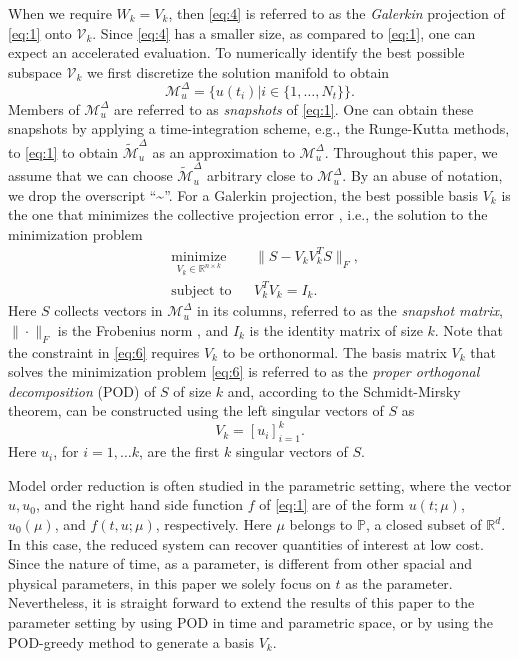 When we require $W_k=V_k$, then \eqref{eq:4} is referred to as the \emph{Galerkin} projection of \eqref{eq:1} onto $\mathcal V_k$. Since \eqref{eq:4} has a smaller size, as compared to \eqref{eq:1}, one can expect an accelerated evaluation. To numerically identify the best possible subspace $\mathcal V_{k}$ we first discretize the solution manifold to obtain
\begin{equation} \label{eq:5}
	\mathcal M_{u}^{\Delta} = \{ u(t_i) | i\in \{ 1,\dots,N_t \} \}.
\end{equation}
Members of $\mathcal M_{u}^{\Delta}$ are referred to as \emph{snapshots} of \eqref{eq:1}. One can obtain these snapshots by applying a time-integration scheme, e.g., the Runge-Kutta methods, to \eqref{eq:1} to obtain $\tilde {\mathcal M}_{u}^{\Delta}$ as an approximation to $\mathcal M_{u}^{\Delta}$. Throughout this paper, we assume that we can choose $\tilde{\mathcal M}_{u}^{\Delta}$ arbitrary close to $\mathcal M_{u}^{\Delta}$. By an abuse of notation, we drop the overscript ``\textasciitilde''. For a Galerkin projection, the best possible basis $V_k$ is the one that minimizes the collective projection error \cite{hesthaven2015certified}, i.e., the solution to the minimization problem
\begin{equation} \label{eq:6}
\begin{aligned}
&  \underset{V_k\in\mathbb R^{n\times k}}{\text{minimize}}
& &  \| S - V_kV_k^TS\|_F, \\
& \text{subject to}
& & V_k^TV_k=I_k.
\end{aligned}
\end{equation}
Here $S$ collects vectors in $\mathcal M_{u}^{\Delta}$ in its columns, referred to as the \emph{snapshot matrix}, $\|\cdot \|_F$ is the Frobenius norm \cite{trefethen97}, and $I_{k}$ is the identity matrix of size $k$. Note that the constraint in \eqref{eq:6} requires $V_k$ to be orthonormal. The basis matrix $V_k$ that solves the minimization problem \eqref{eq:6} is referred to as the \emph{proper orthogonal decomposition} (POD) of $S$ of size $k$ \cite{hesthaven2015certified} and, according to the Schmidt-Mirsky theorem, can be constructed using the left singular vectors of $S$ as
\begin{equation}
	V_{k} = [u_i]_{i=1}^{k}.
\end{equation}
Here $u_i$, for $i=1,\dots k$, are the first $k$ singular vectors of $S$.

Model order reduction is often studied in the parametric setting, where the vector $u,u_0$, and the right hand side function $f$ of \eqref{eq:1} are of the form $u(t;\mu)$, $u_0(\mu)$, and $f(t,u;\mu)$, respectively. Here $\mu$ belongs to $\mathbb P$, a closed subset of $\mathbb R^d$. In this case, the reduced system can recover quantities of interest at low cost. Since the nature of time, as a parameter, is different from other spacial and physical parameters, in this paper we solely focus on $t$ as the parameter. Nevertheless, it is straight forward to extend the results of this paper to the parameter setting by using POD in time and parametric space, or by using the POD-greedy \cite{haasdonk2013convergence,hesthaven2015certified,quarteroni2015reduced} method to generate a basis $V_k$.

